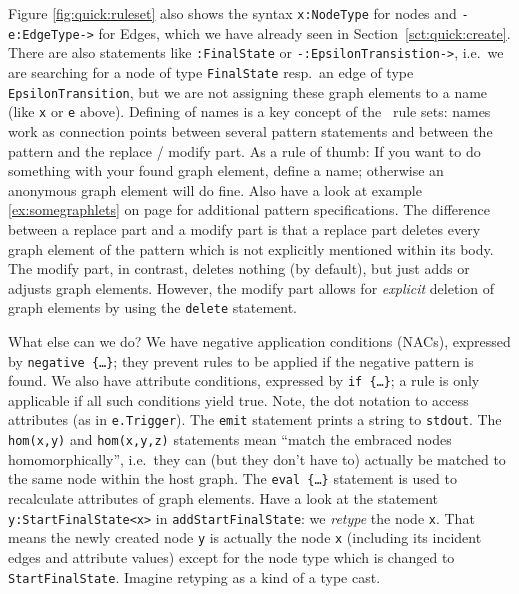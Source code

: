 Figure \ref{fig:quick:ruleset} also shows the syntax \texttt{x:NodeType} for nodes and \texttt{-e:EdgeType->} for Edges, which we have already seen in Section~\ref{sct:quick:create}.
There are also statements like \texttt{:FinalState} or \texttt{-:EpsilonTransistion->}, i.e.\ we are searching for a node of type \texttt{FinalState} resp.\ an edge of type \texttt{EpsilonTransition}, but we are not assigning these graph elements to a name (like \texttt{x} or \texttt{e} above).
Defining of names is a key concept of the \GrG\ rule sets: names work as connection points between several pattern statements and between the pattern and the replace / modify part.
As a rule of thumb: If you want to do something with your found graph element, define a name; otherwise an anonymous graph element will do fine.
Also have a look at example \ref{ex:somegraphlets} on page \pageref{ex:somegraphlets} for additional pattern specifications.
The difference between a replace part and a modify part is that a replace part deletes every graph element of the pattern which is not explicitly mentioned within its body.
The modify part, in contrast, deletes nothing (by default), but just adds or adjusts graph elements.
However, the modify part allows for \emph{explicit} deletion of graph elements by using the \texttt{delete} statement.

What else can we do?
We have negative application conditions (NACs), expressed by \texttt{negative \{\dots\}}; they prevent rules to be applied if the negative pattern is found.
We also have attribute conditions, expressed by \texttt{if \{\dots\}}; a rule is only applicable if all such conditions yield true.
Note, the dot notation to access attributes (as in \texttt{e.Trigger}).
The \texttt{emit} statement prints a string to \texttt{stdout}.
The \texttt{hom(x,y)} and \texttt{hom(x,y,z)} statements mean ``match the embraced nodes homomorphically'', i.e.\ they can (but they don't have to) actually be matched to the same node within the host graph.
The \texttt{eval \{\dots\}} statement is used to recalculate attributes of graph elements.
Have a look at the statement \texttt{y:StartFinalState<x>} in \texttt{addStartFinalState}: we \emph{retype} the node \texttt{x}.
That means the newly created node \texttt{y} is actually the node \texttt{x} (including its incident edges and attribute values) except for the node type which is changed to \texttt{StartFinalState}.
Imagine retyping as a kind of a type cast.


